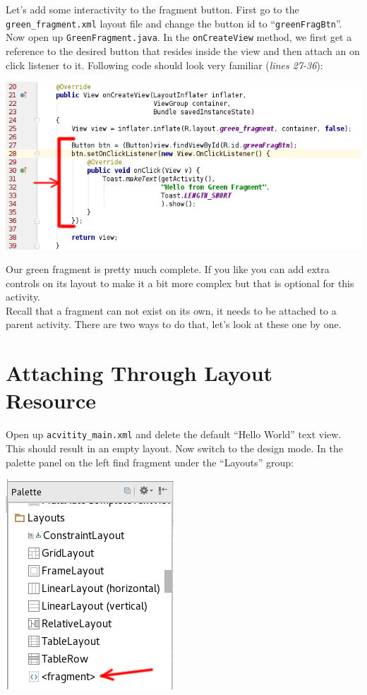 Let's add some interactivity to the fragment button. First go to the \texttt{green\_fragment.xml} layout file and change the button id to ``\texttt{greenFragBtn}''. Now open up \texttt{GreenFragment.java}. In
the \texttt{onCreateView} method, we first get a reference to the desired button that resides inside the view and then attach an on click listener to it. Following code should look very familiar (\textit{lines 27-36}):

\begin{center}
	\includegraphics[scale=\SourceCodeScale]{chapters/ch11/images/8}
\end{center}

Our green fragment is pretty much complete. If you like you can add extra controls on its layout to make it a bit more complex but that is optional for this activity. \\

Recall that a fragment can not exist on its own, it needs to be attached to a parent activity. There are two ways to do that, let's look at these one by one.

\section{Attaching Through Layout Resource}
Open up \texttt{acvitity\_main.xml} and delete the default ``Hello World'' text view. This should result in an empty layout. Now switch to the design mode. In the palette panel on the left find fragment under the ``Layouts'' group:

\begin{center}
	\includegraphics[scale=\SourceCodeScale]{chapters/ch11/images/9}
\end{center}

